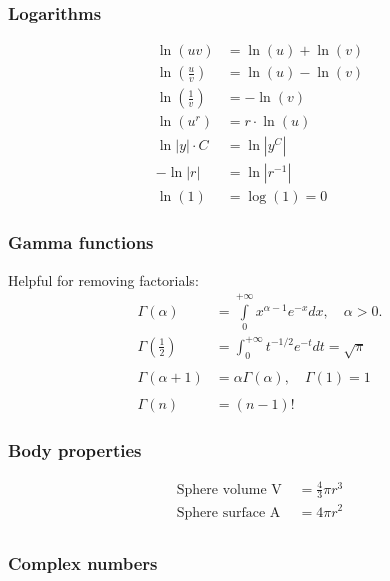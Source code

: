 \subsubsection{Logarithms}
\begin{align*}
    \ln(uv)                     & =\ln(u)+\ln(v) \\
    \ln\left(\frac{u}{v}\right) & =\ln(u)-\ln(v) \\
    \ln\left(\frac{1}{v}\right) & =-\ln(v)       \\
    \ln(u^r)                    & =r\cdot \ln(u) \\
    \ln |y|\cdot C              & = \ln |y^C|    \\
    - \ln |r|                   & = \ln|r^{-1}|  \\
    \ln(1)                      & = \log(1) = 0
\end{align*}


\subsubsection{Gamma functions}
Helpful for removing factorials:
\begin{align*}
    \Gamma(\alpha)             & =\int\limits_{0}^{+\infty}x^{\alpha-1}e^{-x}dx,\quad\alpha>0. \\
    \Gamma\left(\frac12\right) & =\int_0^{+\infty}t^{-1/2}e^{-t}dt=\sqrt{\pi}                  \\ \\
    \Gamma(\alpha+1)           & =\alpha\Gamma(\alpha),\quad \Gamma(1)=1                       \\ \\
    \Gamma(n)                  & =(n-1)!
\end{align*}

\subsubsection{Body properties}
\begin{align*}
    \text{Sphere volume V }  & = \frac{4}{3}\pi r^3 \\
    \text{Sphere surface A } & = 4\pi r^2           \\
\end{align*}

\subsubsection{Complex numbers}

